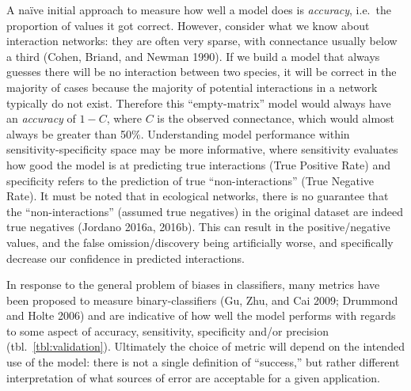 \documentclass[10pt,oneside]{article}
\begin{document}
A naïve initial approach to measure how well a model does is
\emph{accuracy}, i.e.~the proportion of values it got correct. However,
consider what we know about interaction networks: they are often very
sparse, with connectance usually below a third (Cohen, Briand, and
Newman 1990). If we build a model that always guesses there will be no
interaction between two species, it will be correct in the majority of
cases because the majority of potential interactions in a network
typically do not exist. Therefore this ``empty-matrix'' model would
always have an \emph{accuracy} of \(1-C\), where \(C\) is the observed
connectance, which would almost always be greater than 50\%.
Understanding model performance within sensitivity-specificity space may
be more informative, where sensitivity evaluates how good the model is
at predicting true interactions (True Positive Rate) and specificity
refers to the prediction of true ``non-interactions'' (True Negative
Rate). It must be noted that in ecological networks, there is no
guarantee that the ``non-interactions'' (assumed true negatives) in the
original dataset are indeed true negatives (Jordano 2016a, 2016b). This
can result in the positive/negative values, and the false
omission/discovery being artificially worse, and specifically decrease
our confidence in predicted interactions.

In response to the general problem of biases in classifiers, many
metrics have been proposed to measure binary-classifiers (Gu, Zhu, and
Cai 2009; Drummond and Holte 2006) and are indicative of how well the
model performs with regards to some aspect of accuracy, sensitivity,
specificity and/or precision (tbl.~\ref{tbl:validation}). Ultimately the
choice of metric will depend on the intended use of the model: there is
not a single definition of ``success,'' but rather different
interpretation of what sources of error are acceptable for a given
application.
\end{document}
